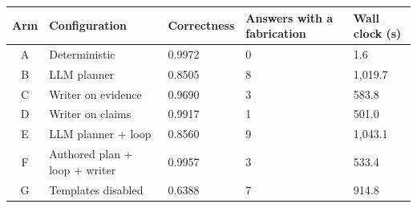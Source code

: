 \begin{tabular}{@{}cL{0.36\textwidth}R{0.14\textwidth}R{0.13\textwidth}R{0.13\textwidth}@{}}
\toprule
Arm & Configuration & Correctness & Answers with a fabrication & Wall clock (s) \\
\midrule
A & Deterministic & 0.9972 & 0 & 1.6 \\
B & LLM planner & 0.8505 & 8 & 1,019.7 \\
C & Writer on evidence & 0.9690 & 3 & 583.8 \\
D & Writer on claims & 0.9917 & 1 & 501.0 \\
E & LLM planner + loop & 0.8560 & 9 & 1,043.1 \\
F & Authored plan + loop + writer & 0.9957 & 3 & 533.4 \\
G & Templates disabled & 0.6388 & 7 & 914.8 \\
\bottomrule
\end{tabular}

